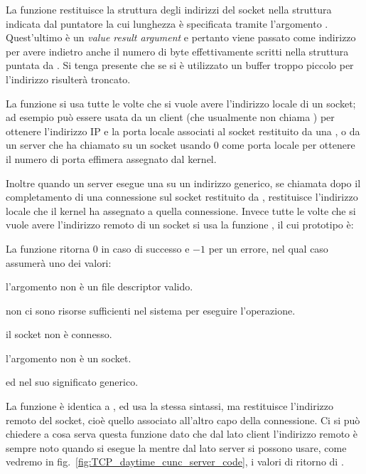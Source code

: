La funzione restituisce la struttura degli indirizzi del socket 
nella struttura indicata dal puntatore  la cui lunghezza è
specificata tramite l'argomento . Quest'ultimo è un
\textit{value result argument} e pertanto viene passato come indirizzo per
avere indietro anche il numero di byte effettivamente scritti nella struttura
puntata da . Si tenga presente che se si è utilizzato un buffer
troppo piccolo per  l'indirizzo risulterà troncato.

La funzione si usa tutte le volte che si vuole avere l'indirizzo locale di un
socket; ad esempio può essere usata da un client (che usualmente non chiama
) per ottenere l'indirizzo IP e la porta locale associati al socket
restituito da una , o da un server che ha chiamato 
su un socket usando $0$ come porta locale per ottenere il numero di porta
effimera assegnato dal kernel.

Inoltre quando un server esegue una  su un indirizzo generico, se
chiamata dopo il completamento di una connessione sul socket restituito da
, restituisce l'indirizzo locale che il kernel ha assegnato a
quella connessione. Invece tutte le volte che si vuole avere l'indirizzo
remoto di un socket si usa la funzione , il cui prototipo
è:

\begin{funcproto}{
}

{La funzione ritorna $0$ in caso di successo e $-1$ per un errore, nel qual
  caso  assumerà uno dei valori: 
  \begin{errlist}
  \item[\errcode{EBADF}] l'argomento  non è un file descriptor
    valido.
  \item[\errcode{ENOBUFS}] non ci sono risorse sufficienti nel sistema per
    eseguire l'operazione.
  \item[\errcode{ENOTCONN}] il socket non è connesso.
  \item[\errcode{ENOTSOCK}] l'argomento  non è un socket.
  \end{errlist}
  ed  nel suo significato generico.}
\end{funcproto}


La funzione è identica a , ed usa la stessa sintassi, ma
restituisce l'indirizzo remoto del socket, cioè quello associato all'altro
capo della connessione.  Ci si può chiedere a cosa serva questa funzione dato
che dal lato client l'indirizzo remoto è sempre noto quando si esegue la
 mentre dal lato server si possono usare, come vedremo in
fig.~\ref{fig:TCP_daytime_cunc_server_code}, i valori di ritorno di
.

